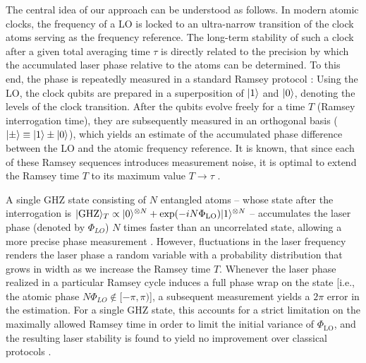 The central idea of our approach can be understood as follows.
In modern atomic clocks, the frequency of a LO is locked to an ultra-narrow
 transition of the clock atoms serving as the
frequency reference.
The long-term stability  of such a clock after a given total averaging time
$\tau$ is directly related to the precision by which the accumulated laser phase
relative to the atoms can be determined. To this end, the phase is repeatedly
measured in a standard Ramsey protocol \cite{Ramsey1950}:
Using the LO, the clock qubits are prepared in a superposition of $| 1 \rangle$ and
$| 0 \rangle$, denoting the levels of the clock transition. After the qubits evolve
freely for a time $T$ (Ramsey interrogation time), they are subsequently
measured in an orthogonal basis ($| \pm \rangle \equiv | 1 \rangle \pm| 0 \rangle$), which
yields an estimate of the accumulated phase difference between the LO and the
atomic frequency reference.
It is known, that since each of these Ramsey sequences introduces measurement
noise, it is optimal to extend the Ramsey time $T$ 
to its maximum value $T\rightarrow\tau$ \cite{Braunstein:1992bx}.

A single GHZ state consisting of $N$ entangled atoms -- whose state after the
interrogation is $| \mathrm{GHZ} \rangle_T \propto | 0 \rangle^{\otimes N} + \mathrm{exp}(-i
N\Phi_{\mathrm{LO}}) | 1 \rangle^{\otimes N}$ -- accumulates the laser phase (denoted
by $\Phi_{LO}$) $N$ times faster than an uncorrelated state, allowing a more
precise phase measurement \cite{Giovanetti2011}. However, fluctuations in the
laser frequency renders the laser phase a
random variable with a probability distribution that grows in width as we
increase  the Ramsey time $T$.
Whenever the laser phase realized in a particular Ramsey cycle induces a full
phase wrap on the state [i.e., the atomic phase $N \Phi_{LO}\notin[-\pi,\pi)$],
a subsequent measurement yields a $2\pi$ error in the estimation. For a single GHZ
state, this accounts for a strict limitation on the maximally allowed Ramsey
time in order  to limit the initial variance of $\Phi_\mathrm{LO}$, and the resulting
laser stability is found to yield no improvement over classical protocols 
\cite{Wineland1998}.



